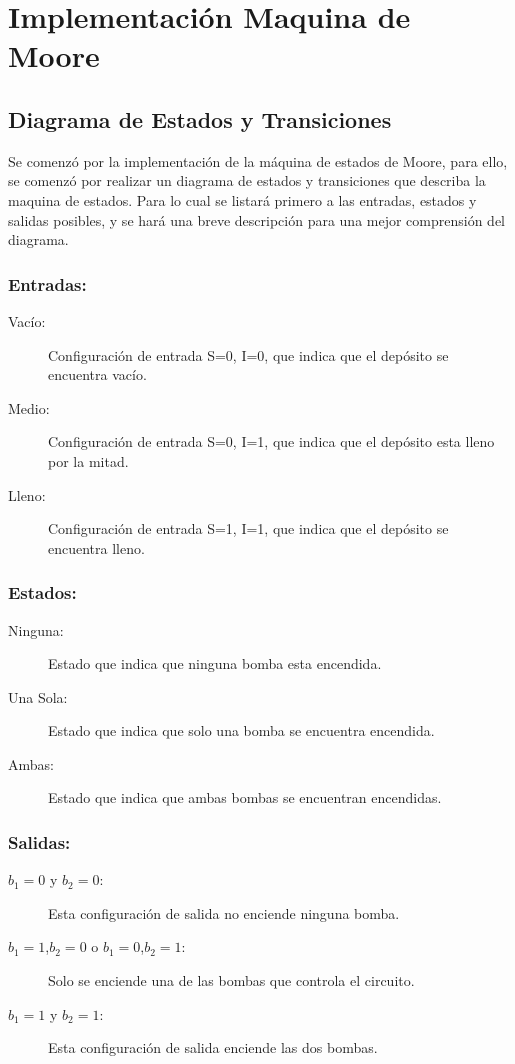 \section*{Implementación Maquina de Moore}
\subsection*{Diagrama de Estados y Transiciones}

Se comenzó por la implementación de la máquina de estados de Moore, para ello, se comenzó por realizar un diagrama de estados y transiciones que describa la maquina de estados. Para lo cual se listará primero a las entradas, estados y salidas posibles, y se hará una breve descripción para una mejor comprensión del diagrama.

\subsubsection*{Entradas:}

\begin{description}
\item[Vacío:] Configuración de entrada S=0, I=0, que indica que el depósito se encuentra vacío.
\item[Medio:] Configuración de entrada S=0, I=1, que indica que el depósito esta lleno por la mitad.
\item[Lleno:] Configuración de entrada S=1, I=1, que indica que el depósito se encuentra lleno.
\end{description}

\subsubsection*{Estados:}

\begin{description}
\item[Ninguna:] Estado que indica que ninguna bomba esta encendida.
\item[Una Sola:] Estado que indica que solo una bomba se encuentra encendida.
\item[Ambas:] Estado que indica que ambas bombas se encuentran encendidas.
\end{description}

\subsubsection*{Salidas:}

\begin{description}
\item[$b_1=0$ y $b_2=0$:] Esta configuración de salida no enciende ninguna bomba.
\item[$b_1=1$,$b_2=0$ o $b_1=0$,$b_2=1$:] Solo se enciende una de las bombas que controla el circuito.
\item[$b_1=1$ y $b_2=1$:] Esta configuración de salida enciende las dos bombas.
\end{description}

